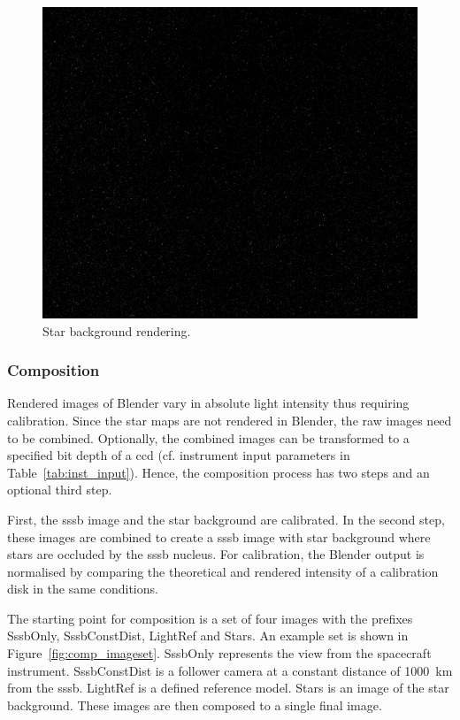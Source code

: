 \begin{figure}[htb]
    \centering
    \includegraphics[width=\textwidth]{doc/thesis/0_figures/star_rendering/Stars_2017-08-15T115856-171000.png}
    \caption{Star background rendering.}
    \label{fig:star_rendering}
\end{figure}

\subsubsection{Composition} \label{sec:composition}
Rendered images of Blender vary in absolute light intensity thus requiring calibration. Since the star maps are not rendered in Blender, the raw images need to be combined. Optionally, the combined images can be transformed to a specified bit depth of a \gls{ccd} (cf. instrument input parameters in Table~\ref{tab:inst_input}). Hence, the composition process has two steps and an optional third step. 

First, the \gls{sssb} image and the star background are calibrated. In the second step, these images are combined to create a \gls{sssb} image with star background where stars are occluded by the \gls{sssb} nucleus. For calibration, the Blender output is normalised by comparing the theoretical and rendered intensity of a calibration disk in the same conditions.

The starting point for composition is a set of four images with the prefixes SssbOnly, SssbConstDist, LightRef and Stars. An example set is shown in Figure~\ref{fig:comp_imageset}. SssbOnly represents the view from the spacecraft instrument. SssbConstDist is a follower camera at a constant distance of \SI{1000}{\kilo\meter} from the \gls{sssb}. LightRef is a defined reference model. Stars is an image of the star background. These images are then composed to a single final image.

